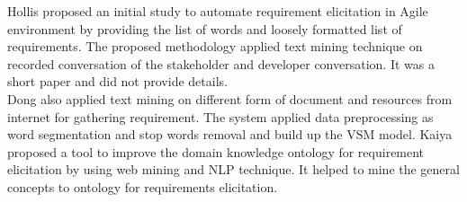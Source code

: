 Hollis \etal \cite{Hollis2017} proposed an initial study to automate requirement
elicitation in Agile environment by providing the list of words and loosely
formatted list of requirements. The proposed methodology applied text mining
technique on recorded conversation of the stakeholder and developer
conversation. It was a short paper and did not provide details.\\

Dong \etal \cite{dong2010} also applied text mining on different form of
document and resources from internet for gathering requirement. The system
applied data preprocessing as word segmentation and stop words removal and build
up the VSM model. Kaiya \etal \cite{Kaiya:2010} proposed a tool to improve the
domain knowledge ontology for requirement elicitation by using web mining and
NLP technique. It helped to mine the general concepts to ontology for
requirements elicitation.\\


